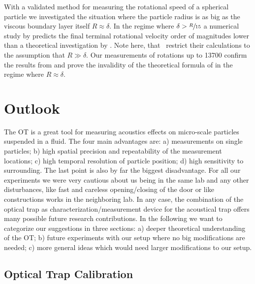 With a validated method for measuring the rotational speed of a spherical 
particle we investigated the situation where the particle radius is as big as 
the viscous boundary layer itself $R\approx\delta$. In the regime where $\delta 
> \sfrac{R}{15}$ a numerical study by  predicts the final 
terminal rotational velocity order of magnitudes lower than a theoretical 
investigation by . Note here, that~\cite{Lamprecht2015} 
restrict their calculations to the assumption that $R\gg\delta$. Our 
measurements of rotations up to \SI{13700}{\rpm} confirm the results from 
 and prove the invalidity of the theoretical formula of 
 in the regime where $R\approx\delta$.

\section{Outlook}

The OT is a great tool for measuring acoustics effects on micro-scale particles 
suspended in a fluid. The four main advantages are: a) measurements on single 
particles; b) high spatial precision and repeatability of the measurement 
locations; c) high temporal resolution of particle position; d) high 
sensitivity to surrounding. The last point is also by far the biggest 
disadvantage. For all our experiments we were very cautious about us being in 
the same lab and any other disturbances, like fast and careless opening/closing 
of the door or like constructions works in the neighboring lab. In any case, 
the combination of the optical trap as characterization/measurement device for 
the acoustical trap offers many possible future research contributions. In the 
following we want to categorize our suggestions in three sections: a) deeper 
theoretical understanding of the OT; b) future experiments with our setup where 
no big modifications are needed; c) more general ideas which would need larger 
modifications to our setup.

\subsection{Optical Trap Calibration}

